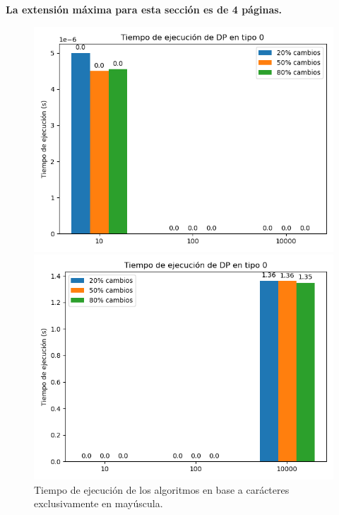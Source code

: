 \begin{mdframed}
    \textbf{La extensión máxima para esta sección es de 4 páginas.}
\end{mdframed}

\begin{figure}[H]
    \centering
    \begin{minipage}[t]{0.5\textwidth}
        \includegraphics[width=\textwidth]{images/0_bruteforce.png}
    \end{minipage}%
    \begin{minipage}[t]{0.5\textwidth}
        \includegraphics[width=\textwidth]{images/0_dp.png}    \end{minipage}%
    \caption{Tiempo de ejecución de los algoritmos en base a carácteres exclusivamente en mayúscula.}
    \label{fig:scatterplot_3}
\end{figure}


